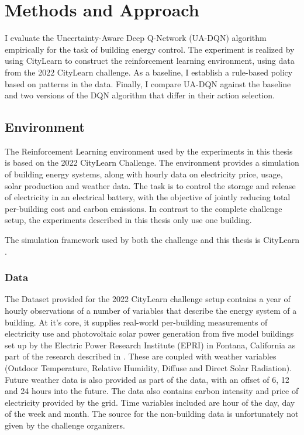 \chapter{Methods and Approach}
    \label{approach}

I evaluate the Uncertainty-Aware Deep Q-Network (UA-DQN) algorithm empirically for the task of building energy control.
The experiment is realized by using CityLearn to construct the reinforcement learning environment, using data from the 2022 CityLearn challenge.
As a baseline, I establish a rule-based policy based on patterns in the data.
Finally, I compare UA-DQN against the baseline and two versions of the DQN algorithm that differ in their action selection.





\section{Environment}
The Reinforcement Learning environment used by the experiments in this thesis is based on the 2022 CityLearn Challenge.
The environment provides a simulation of building energy systems, along with hourly data on electricity price, usage, solar production and weather data.
The task is to control the storage and release of electricity in an electrical battery, with the objective of jointly reducing total per-building cost and carbon emissions.
In contrast to the complete challenge setup, the experiments described in this thesis only use one building.

The simulation framework used by both the challenge and this thesis is CityLearn \cite{vazquez-canteli2019CityLearnV1OpenAI}.

\subsection{Data}
The Dataset provided for the 2022 CityLearn challenge setup contains a year of hourly observations of a number of variables that describe the energy system of a building.
At it's core, it supplies real-world per-building measurements of electricity use and photovoltaic solar power generation from five model buildings set up by the Electric Power Research Institute (EPRI) in Fontana, California as part of the research described in \cite{narayanamurthy2016GridIntegrationZero}.
These are coupled with weather variables (Outdoor Temperature, Relative Humidity, Diffuse and Direct Solar Radiation).
Future weather data is also provided as part of the data, with an offset of 6, 12 and 24 hours into the future.
The data also contains carbon intensity and price of electricity provided by the grid.
Time variables included are hour of the day, day of the week and month.
The source for the non-building data is unfortunately not given by the challenge organizers.

